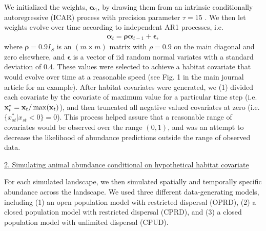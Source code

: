 \documentclass[12pt,fleqn]{article}
\begin{document}
\begin{flushleft}
\hspace{.5in} We initialized the weights, $\boldsymbol{\alpha}_1$, by drawing them from an intrinsic conditionally autoregressive (ICAR) process with precision parameter $\tau = 15$ \citep[see e.g.][]{RueHeld2005}.  We then let weights evolve over time according to independent AR1 processes, i.e.
\begin{eqnarray}
  \boldsymbol{\alpha}_t = \boldsymbol{\rho} \boldsymbol{\alpha}_{t-1} + \boldsymbol{\epsilon},
  \label{eq:alpha}
\end{eqnarray}
where $\boldsymbol{\rho}=0.9 I_S$ is an $(m \times m)$ matrix with $\rho = 0.9$ on the main diagonal and zero elsewhere, and $\boldsymbol{\epsilon}$ is a vector of iid random normal variates with a standard deviation of 0.4.  These values were selected to achieve a habitat covariate that would evolve over time at a reasonable speed (see Fig. 1 in the main journal article for an example).  After habitat covariates were generated, we (1) divided each covariate by the covariate of maximum value for a particular time step (i.e. ${\bf x}_t^* = {\bf x}_t / \max ({\bf x}_t)$), and then truncated all negative valued covariates at zero (i.e. $\{ x_{st}^* | x_{st} < 0 \} = 0$).  This process helped assure that a reasonable range of covariates would be observed over the range $(0,1)$, and was an attempt to decrease the likelihood of abundance predictions outside the range of observed data.

\underline{2. Simulating animal abundance conditional on hypothetical habitat covariate}

For each simulated landscape, we then simulated spatially and temporally specific abundance across the landscape.  We used three different data-generating models, including (1) an open population model with restricted dispersal (OPRD), (2) a closed population model with restricted dispersal (CPRD), and (3) a closed population model with unlimited dispersal (CPUD).


\end{flushleft}
\end{document}
